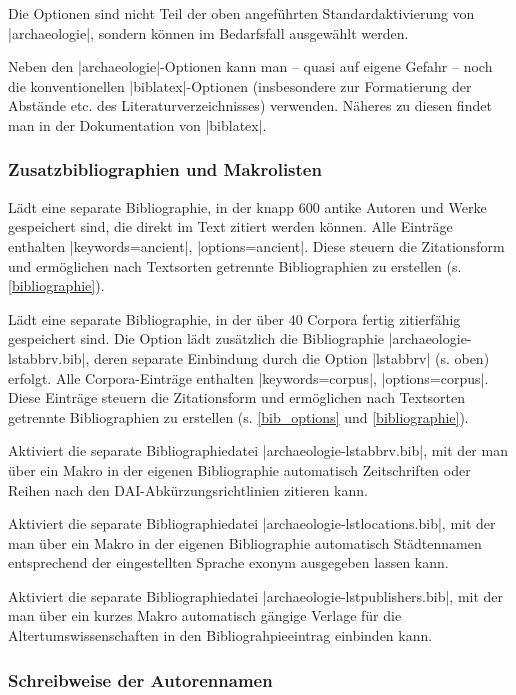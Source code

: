 \documentclass[a4paper,10pt,ngerman]{ltxdoc}
\begin{document}
Die Optionen sind nicht Teil der oben angeführten Standardaktivierung von |archaeologie|, sondern können im Bedarfsfall ausgewählt werden.

Neben den |archaeologie|-Optionen kann man -- quasi auf eigene Gefahr -- noch die konventionellen |biblatex|-Optionen (insbesondere zur Formatierung der Abstände etc. des Literaturverzeichnisses) verwenden. Näheres zu diesen findet man in der Dokumentation von |biblatex|.

\subsubsection{Zusatzbibliographien und Makrolisten}

  Lädt eine separate Bibliographie,
in der knapp 600 antike Autoren und Werke gespeichert sind, die direkt im Text zitiert werden können. 
Alle Einträge enthalten |keywords={ancient}|, |options={ancient}|. 
Diese steuern die Zitationsform und ermöglichen nach Textsorten getrennte Bibliographien zu erstellen (s. \cref{bibliographie}).
 
  Lädt eine separate Bibliographie,
in der über 40 Corpora fertig zitierfähig gespeichert sind.
Die Option lädt zusätzlich die Bibliographie |archaeologie-lstabbrv.bib|, deren separate Einbindung durch die Option |lstabbrv| (s. oben) erfolgt.
Alle Corpora-Einträge enthalten |keywords={corpus}|, |options={corpus}|. 
Diese Einträge steuern die Zitationsform und ermöglichen nach Textsorten getrennte Bibliographien zu erstellen (s. \cref{bib_options} und \ref{bibliographie}).

  Aktiviert die separate Bibliographiedatei |archaeologie-lstabbrv.bib|, mit der man über ein Makro in der eigenen Bibliographie automatisch Zeitschriften oder Reihen nach den DAI-Abkürzungsrichtlinien zitieren kann. 

  Aktiviert die separate Bibliographiedatei |archaeologie-lstlocations.bib|, mit der man über ein Makro in der eigenen Bibliographie automatisch  Städtennamen entsprechend der eingestellten Sprache exonym ausgegeben lassen kann.

  Aktiviert die separate Bibliographiedatei |archaeologie-lstpublishers.bib|, mit der man über ein kurzes Makro automatisch gängige Verlage für die Altertumswissenschaften in den Bibliograhpieeintrag einbinden kann.

\subsubsection{Schreibweise der Autorennamen}
\end{document}

